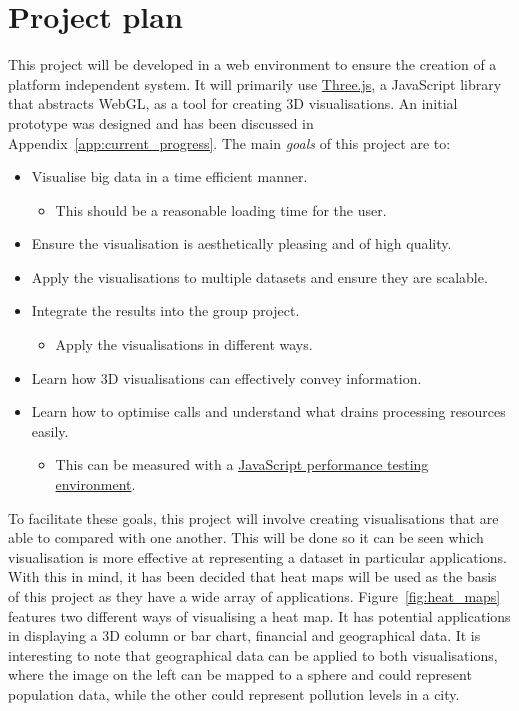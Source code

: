 \documentclass[a4paper]{article}
\begin{document}
	\section{Project plan} {
	\label{sec:project_plan}
		
		This project will be developed in a web environment to ensure the creation of a platform independent system. It will primarily use \href{http://threejs.org/}{Three.js}, a JavaScript library that abstracts WebGL, as a tool for creating 3D visualisations. An initial prototype was designed and has been discussed in Appendix~\ref{app:current_progress}. The main \emph{goals} of this project are to:
		
		\begin{itemize}
			\item Visualise big data in a time efficient manner.
			\begin{itemize}
				\item This should be a reasonable loading time for the user.
			\end{itemize}
			\item Ensure the visualisation is aesthetically pleasing and of high quality.
			\item Apply the visualisations to multiple datasets and ensure they are scalable. 
			\item Integrate the results into the group project.
			\begin{itemize}
				\item Apply the visualisations in different ways.
			\end{itemize}
			\item Learn how 3D visualisations can effectively convey information.
			\item Learn how to optimise calls and understand what drains processing resources easily.
			\begin{itemize}
				\item This can be measured with a \href{http://jsperf.com/}{JavaScript performance testing environment}.
			\end{itemize}
		\end{itemize}
		
		To facilitate these goals, this project will involve creating visualisations that are able to compared with one another. This will be done so it can be seen which visualisation is more effective at representing a dataset in particular applications. With this in mind, it has been decided that heat maps will be used as the basis of this project as they have a wide array of applications. Figure~\ref{fig:heat_maps} features two different ways of visualising a heat map. It has potential applications in displaying a 3D column or bar chart, financial and geographical data. It is interesting to note that geographical data can be applied to both visualisations, where the image on the left can be mapped to a sphere and could represent population data, while the other could represent pollution levels in a city.
		
}
\end{document}

